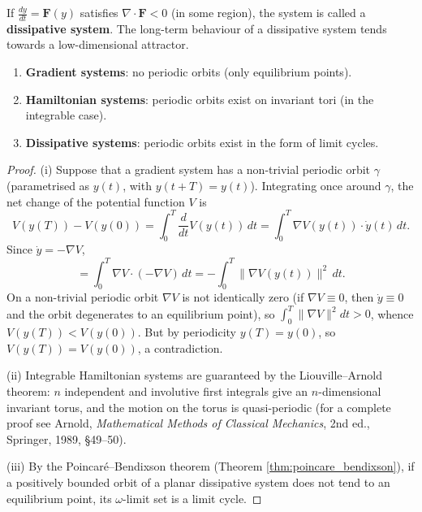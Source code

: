 \begin{definition}\label{def:dissipative_system}
If $\frac{dy}{dt} = \mathbf{F}(y)$ satisfies $\nabla \cdot \mathbf{F} < 0$ (in some region), the system is called a \textbf{dissipative system}. The long-term behaviour of a dissipative system tends towards a low-dimensional attractor.
\end{definition}

\begin{theorem}\label{thm:three_operator_periodic}
\begin{enumerate}[label=(\roman*)]
    \item \textbf{Gradient systems}: no periodic orbits (only equilibrium points).
    \item \textbf{Hamiltonian systems}: periodic orbits exist on invariant tori (in the integrable case).
    \item \textbf{Dissipative systems}: periodic orbits exist in the form of limit cycles.
\end{enumerate}
\end{theorem}

\begin{proof}
(i) Suppose that a gradient system has a non-trivial periodic orbit $\gamma$ (parametrised as $y(t)$, with $y(t+T) = y(t)$). Integrating once around $\gamma$, the net change of the potential function $V$ is
\[
V(y(T)) - V(y(0)) = \int_0^T \frac{d}{dt}V(y(t))\,dt = \int_0^T \nabla V(y(t)) \cdot \dot{y}(t)\,dt.
\]
Since $\dot{y} = -\nabla V$,
\[
= \int_0^T \nabla V \cdot (-\nabla V)\,dt = -\int_0^T \|\nabla V(y(t))\|^2\,dt.
\]
On a non-trivial periodic orbit $\nabla V$ is not identically zero (if $\nabla V \equiv 0$, then $\dot{y} \equiv 0$ and the orbit degenerates to an equilibrium point), so $\int_0^T \|\nabla V\|^2 dt > 0$, whence $V(y(T)) < V(y(0))$. But by periodicity $y(T) = y(0)$, so $V(y(T)) = V(y(0))$, a contradiction.

(ii) Integrable Hamiltonian systems are guaranteed by the Liouville--Arnold theorem: $n$ independent and involutive first integrals give an $n$-dimensional invariant torus, and the motion on the torus is quasi-periodic (for a complete proof see Arnold, \textit{Mathematical Methods of Classical Mechanics}, 2nd ed., Springer, 1989, \S{}49--50).

(iii) By the Poincaré--Bendixson theorem (Theorem \ref{thm:poincare_bendixson}), if a positively bounded orbit of a planar dissipative system does not tend to an equilibrium point, its $\omega$-limit set is a limit cycle.
\end{proof}

